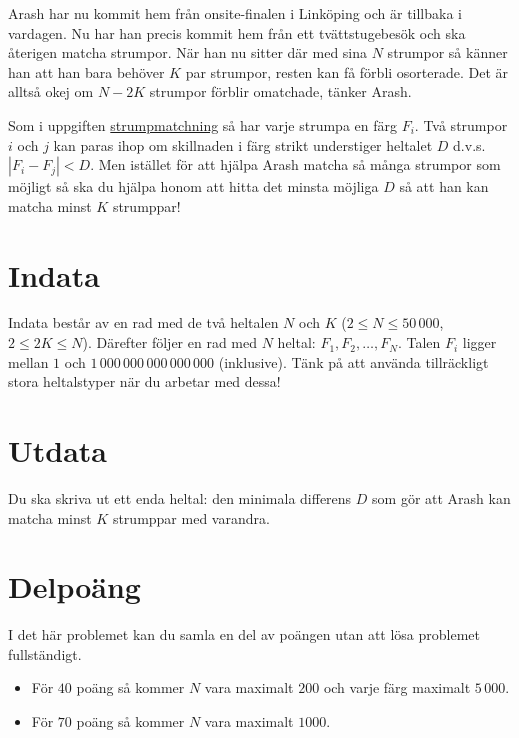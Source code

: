 
Arash har nu kommit hem från onsite-finalen i Linköping och är tillbaka i
vardagen. Nu har han precis kommit hem från ett tvättstugebesök och ska
återigen matcha strumpor. När han nu sitter där med sina $N$ strumpor
så känner han att han bara behöver $K$ par strumpor, resten kan få förbli
osorterade. Det är alltså okej om $N-2K$ strumpor förblir omatchade, tänker Arash.

Som i uppgiften \href{https://po.scrool.se/problems/strumpor}{strumpmatchning}
så har varje strumpa en färg $F_i$. Två strumpor $i$ och $j$ kan paras ihop om
skillnaden i färg strikt understiger heltalet $D$ d.v.s. $|F_{i} - F_{j}|<D$.
Men istället för att hjälpa Arash matcha så många strumpor som möjligt så ska
du hjälpa honom att hitta det minsta möjliga $D$
så att han kan matcha minst $K$ strumppar!

\section*{Indata}

Indata består av en rad med de två heltalen $N$ och $K$ ($2 \le N
\le 50\,000$, $2 \le 2K \le N$). Därefter följer en rad med $N$
heltal: $F_1, F_2, \dots, F_N$. Talen $F_i$ ligger mellan $1$
och $1\,000\,000\,000\,000\,000$ (inklusive). Tänk på att använda
tillräckligt stora heltalstyper när du arbetar med dessa!

\section*{Utdata}

Du ska skriva ut ett enda heltal: den minimala differens $D$ som gör att Arash kan
matcha minst $K$ strumppar med varandra.

\section*{Delpoäng}

I det här problemet kan du samla en del av poängen utan att lösa
problemet fullständigt.

\begin{itemize}
    \item För $40$ poäng så kommer $N$ vara maximalt $200$ och varje färg maximalt $5\,000$.
    \item För $70$ poäng så kommer $N$ vara maximalt $1000$.
\end{itemize}
